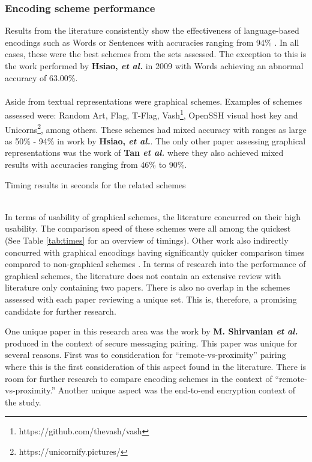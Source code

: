\subsubsection*{Encoding scheme performance}
Results 
from the literature consistently show the effectiveness of language-based encodings such as Words or Sentences with accuracies ranging from 94\% \cite{dechand2016empirical}\cite{tan2017can}\cite{kainda2009usability}. In all cases, these were the best schemes from the sets assessed. The exception to this is the work performed by \textbf{Hsiao, \textit{et al.}}\cite{hsiao2009study} in 2009 with Words achieving an abnormal accuracy of 63.00\%.
\\\\
Aside from textual representations were graphical schemes. Examples of schemes assessed were: Random Art\cite{perrig1999hash}, Flag\cite{ellison2003public}, T-Flag\cite{lin2010spate}, Vash\footnote{https://github.com/thevash/vash}, OpenSSH visual host key and Unicorns\footnote{https://unicornify.pictures/}, among others. These schemes had mixed accuracy with ranges as large as 50\% - 94\% in work by \textbf{Hsiao, \textit{et al.}}\cite{hsiao2009study}. The only other paper assessing graphical representations was the work of \textbf{Tan \textit{et al.}}\cite{tan2017can} where they also achieved mixed results with accuracies ranging from 46\% to 90\%.
\\
\begin{table}[h!]
    \makebox[\textwidth][c]{
        
    }%
    \caption{Timing results in seconds for the related schemes}
    \label{tab:times}
\end{table}
\\
In terms of usability of graphical schemes, the literature concurred on their high usability. The comparison speed of these schemes were all among the quickest (See Table \ref{tab:times} for an overview of timings). Other work also indirectly concurred with graphical encodings having significantly quicker comparison times compared to non-graphical schemes \cite{dechand2016empirical}\cite{kainda2009usability}.
In terms of research into the performance of graphical schemes, the literature does not contain an extensive review with literature only containing two papers. There is also no overlap in the schemes assessed with each paper reviewing a unique set. This is, therefore, a promising candidate for further research.

One unique paper in this research area was the work by \textbf{M. Shirvanian \textit{et al.}}\cite{shirvanian2017pitfalls} produced in the context of secure messaging pairing. This paper was unique for several reasons. First was to consideration for ``remote-vs-proximity'' pairing where this is the first consideration of this aspect found in the literature. There is room for further research to compare encoding schemes in the context of ``remote-vs-proximity.'' Another unique aspect was the end-to-end encryption context of the study.

